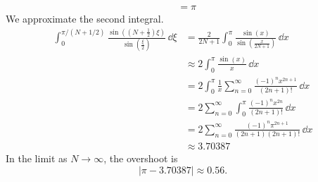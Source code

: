 {\begin{Solution}
\begin{enumerate}
\begin{align*}
      \\
      &= \pi 
    \end{align*}
    We approximate the second integral.
    \begin{align*}
      \int_0^{\pi/(N+1/2)}
      \frac{ \sin \left( \left( N + \frac{1}{2} \right)\xi \right) }
      { \sin \left( \frac{\xi}{2} \right) }\,\dd \xi
      &= \frac{2}{2 N + 1}
      \int_0^\pi \frac{ \sin(x) }{ \sin \left( \frac{x}{2 N + 1} \right) }\,\dd x
      \\
      &\approx 2 \int_0^\pi \frac{ \sin(x) }{ x }\,\dd x
      \\
      &= 2 \int_0^\pi \frac{ 1 }{ x } \sum_{n = 0}^\infty \frac{(-1)^n x^{2 n + 1}}{ (2 n + 1)! } \,\dd x
      \\
      &= 2 \sum_{n = 0}^\infty \int_0^\pi \frac{(-1)^n x^{2 n}}{ (2 n + 1)! } \,\dd x
      \\
      &= 2 \sum_{n = 0}^\infty \frac{(-1)^n \pi^{2 n + 1}}{ (2 n + 1) (2 n + 1)! } \,\dd x
      \\
      &\approx 3.70387
    \end{align*}
    In the limit as $N \to \infty$, the overshoot is 
    \[
    | \pi - 3.70387| \approx 0.56.
    \]
  \end{enumerate}
\end{Solution}












}
